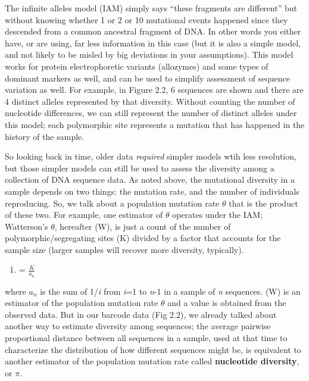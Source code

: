 \documentclass[
]{article}
\providecommand{\tightlist}{%
  \setlength{\itemsep}{0pt}\setlength{\parskip}{0pt}}
\begin{document}
The infinite alleles model (IAM) simply says ``these fragments are
different'' but without knowing whether 1 or 2 or 10 mutational events
happened since they descended from a common ancestral fragment of DNA.
In other words you either have, or are using, far less information in
this case (but it is also a simple model, and not likely to be misled by
big deviations in your assumptions). This model works for protein
electrophoretic variants (allozymes) and some types of dominant markers
as well, and can be used to simplify assessment of sequence variation as
well. For example, in Figure 2.2, 6 sequences are shown and there are 4
distinct alleles represented by that diversity. Without counting the
number of nucleotide differences, we can still represent the number of
distinct alleles under this model; each polymorphic site represents a
mutation that has happened in the history of the sample.

So looking back in time, older data \emph{required} simpler models wtih
less resolution, but those simpler models can still be used to assess
the diversity among a collection of DNA sequence data. As noted above,
the mutational diversity in a sample depends on two things: the mutation
rate, and the number of individuals reproducing. So, we talk about a
population mutation rate \(\theta\) that is the product of these two.
For example, one estimator of \(\theta\) operates under the IAM;
Watterson's \(\theta\), hereafter (W), is just a count of the number of
polymorphic/segregating sites (K) divided by a factor that accounts for
the sample size (larger samples will recover more diversity, typically).

\begin{enumerate}
\def\labelenumi{(\Alph{enumi})}
\setcounter{enumi}{22}
\tightlist
\item
  = \(\frac{K}{a_n}\)
\end{enumerate}

where \({a_n}\) is the sum of 1/\emph{i} from \emph{i}=1 to \emph{n}-1
in a sample of \emph{n} sequences. (W) is an estimator of the population
mutation rate \(\theta\) and a value is obtained from the observed data.
But in our barcode data (Fig 2.2), we already talked about another way
to estimate diversity among sequences; the average pairwise proportional
distance between all sequences in a sample, used at that time to
characterize the distribution of how different sequences might be, is
equivalent to another estimator of the population mutation rate called
\textbf{nucleotide diversity}, or \(\pi\).
\end{document}

